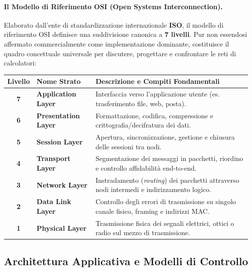 \documentclass[12pt]{extarticle}
\begin{document}
\paragraph{Il Modello di Riferimento OSI (Open Systems Interconnection).}
Elaborato dall'ente di standardizzazione internazionale \textbf{ISO}, il modello di riferimento OSI definisce una suddivisione canonica a \textbf{7 livelli}. Pur non essendosi affermato commercialmente come implementazione dominante, costituisce il quadro concettuale universale per discutere, progettare e confrontare le reti di calcolatori:

\begin{center}
\small
\begin{tabular}{cp{3.4cm}p{9.4cm}}
    \toprule
    \textbf{Livello} & \textbf{Nome Strato} & \textbf{Descrizione e Compiti Fondamentali} \\
    \midrule
    \textbf{7} & \textbf{Application Layer} & Interfaccia verso l'applicazione utente (es. trasferimento file, web, posta). \\
    \addlinespace
    \textbf{6} & \textbf{Presentation Layer} & Formattazione, codifica, compressione e crittografia/decifratura dei dati. \\
    \addlinespace
    \textbf{5} & \textbf{Session Layer} & Apertura, sincronizzazione, gestione e chiusura delle sessioni tra nodi. \\
    \addlinespace
    \textbf{4} & \textbf{Transport Layer} & Segmentazione dei messaggi in pacchetti, riordino e controllo affidabilità end-to-end. \\
    \addlinespace
    \textbf{3} & \textbf{Network Layer} & Instradamento (\textit{routing}) dei pacchetti attraverso nodi intermedi e indirizzamento logico. \\
    \addlinespace
    \textbf{2} & \textbf{Data Link Layer} & Controllo degli errori di trasmissione su singolo canale fisico, framing e indirizzi MAC. \\
    \addlinespace
    \textbf{1} & \textbf{Physical Layer} & Trasmissione fisica dei segnali elettrici, ottici o radio sul mezzo di trasmissione. \\
    \bottomrule
\end{tabular}
\end{center}

\subsection{Architettura Applicativa e Modelli di Controllo}
\end{document}
